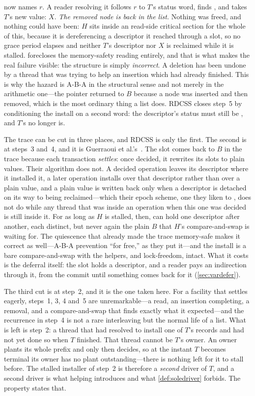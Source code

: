 \documentclass[11pt]{article}
\begin{document}
\noindent {} now names $r$. A reader resolving it follows $r$ to
$T$'s status word, finds \SUCCEEDED, and takes $T$'s new value: $X$. \emph{The
removed node is back in the list.} Nothing was freed, and nothing could have
been: $H$ sits inside an \rcu read-side critical section for the whole of this,
because it is dereferencing a descriptor it reached through a slot, so no grace
period elapses and neither $T$'s descriptor nor $X$ is reclaimed while it is
stalled. \rcu forecloses the memory-safety reading entirely, and that is what
makes the real failure visible: the structure is simply \emph{incorrect}. A
deletion has been undone by a thread that was trying to help an insertion which
had already finished. This is why the hazard is A-B-A in the
structural sense and not merely in the arithmetic one---the pointer returned to
$B$ because a node was inserted and then removed, which is the most ordinary
thing a list does. RDCSS closes step~5 by conditioning the install on a second
word: the descriptor's status must still be \UNDECIDED, and $T$'s no longer is.

The trace can be cut in three places, and RDCSS is only the first. The second is
at steps~3 and~4, and it is Guerraoui et al.'s~\citep{guerraoui2020mcas}. The
slot comes back to $B$ in the trace because each transaction \emph{settles}:
once decided, it rewrites its slots to plain values. Their algorithm does not.
A decided operation leaves its descriptor where it installed it, a later
operation installs over that descriptor rather than over a plain value, and a
plain value is written back only when a descriptor is detached on its way to
being reclaimed---which their epoch scheme, one they liken to \rcu, does not do
while any thread that was inside an operation when this one was decided is still
inside it. For as long as $H$ is stalled, then,  can hold one
descriptor after another, each distinct, but never again the plain $B$ that
$H$'s compare-and-swap is waiting for. The quiescence that already made the
trace memory-safe makes it correct as well---A-B-A prevention ``for free,'' as
they put it---and the install is a bare compare-and-swap with the helpers, and
lock-freedom, intact. What it costs is the deferral itself: the slot holds a
descriptor, and a reader pays an indirection through it, from the commit until
something comes back for it (\cref{sec:vardefer}).

The third cut is at step~2, and it is the one taken here. For a facility that
settles eagerly, steps~1, 3, 4 and~5 are unremarkable---a read, an insertion
completing, a removal, and a compare-and-swap that finds exactly what it
expected---and the recurrence in step~4 is not a rare interleaving but the
normal life of a list. What is left is step~2: a thread that had resolved to
install one of $T$'s records and had not yet done so when $T$ finished. That
thread cannot be $T$'s owner. An owner plants its whole prefix and only then
decides, so at the instant $T$ becomes terminal its owner has no plant
outstanding---there is nothing left for it to stall before. The stalled
installer of step~2 is therefore a \emph{second} driver of $T$, and a second
driver is what helping introduces and what \cref{def:soledriver} forbids. The
property states that.
\end{document}
